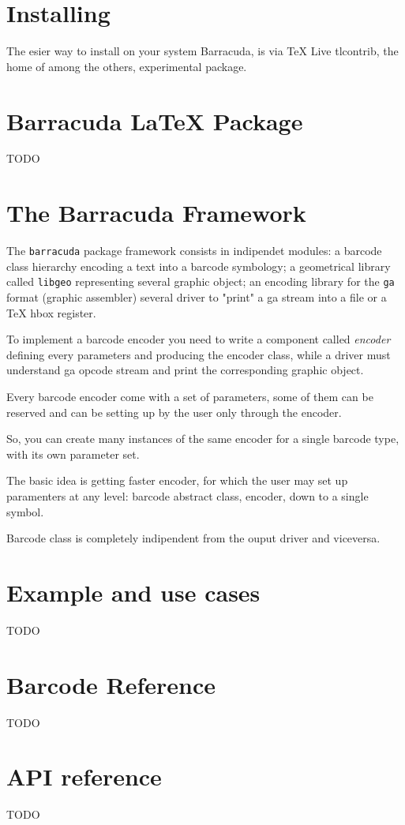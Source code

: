 \documentclass[11pt]{article}
\newcommand{\code}[1]{\texttt{#1}}
\newcommand{\brcd}{\code{barracuda}}
\begin{document}
\section{Installing}
\label{secInstall}

The esier way to install on your system Barracuda, is via TeX Live tlcontrib,
the home of among the others, experimental package.


\section{Barracuda \LaTeX{} Package}
\label{secLaTeXPkg}

TODO


\section{The Barracuda Framework}
\label{secFramework}

The \brcd{} package framework consists in indipendet modules: a barcode class
hierarchy encoding a text into a barcode symbology; a geometrical library called
\code{libgeo} representing several graphic object; an encoding library for the
\code{ga} format (graphic assembler) several driver to "print" a ga stream
into a file or a \TeX{} hbox register.

To implement a barcode encoder you need to write a component called
\emph{encoder} defining every parameters and producing the encoder class, while
a driver must understand ga opcode stream and print the corresponding graphic
object.

Every barcode encoder come with a set of parameters, some of them can be
reserved and can be setting up by the user only through the encoder.

So, you can create many instances of the same encoder for a single barcode
type, with its own parameter set.

The basic idea is getting faster encoder, for which the user may set up
paramenters at any level: barcode abstract class, encoder, down to a single
symbol.

Barcode class is completely indipendent from the ouput driver and viceversa.


\section{Example and use cases}
\label{secExample}

TODO

\section{Barcode Reference}
\label{secBcRef}

TODO

\section{API reference}
\label{secAPI}

TODO
\end{document}
